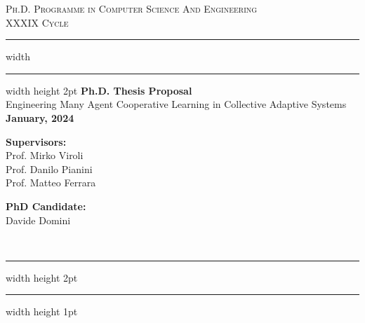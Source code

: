 \documentclass[12pt]{article}
\begin{document}
\begin{titlepage}

	\newcommand{\HRule}{\rule{\linewidth}{0.5mm}}
	\center
	
	\textsc{\Large Ph.D. Programme in Computer Science And Engineering}\\[0.5cm]
	
	\textsc{\Large XXXIX Cycle}\\[0.6cm]
	
	\hrule width \hsize \kern 1mm \hrule width \hsize height 2pt 
	\vspace{0.8cm}
	{ \large \bfseries Ph.D. Thesis Proposal}\\[0.6cm]
	{ \large Engineering Many Agent Cooperative Learning in Collective Adaptive Systems }\\[0.6cm]





	\bfseries{January, 2024}


    \vspace{1.5cm}
    
    \noindent
    \begin{minipage}[t]{0.45\textwidth}
        \raggedright
        \textbf{Supervisors:}\\[0.5cm]
        Prof. Mirko Viroli\\
        Prof. Danilo Pianini\\
        Prof. Matteo Ferrara
    \end{minipage}%
    \hfill
    \begin{minipage}[t]{0.45\textwidth}
        \raggedleft
        \textbf{PhD Candidate:}\\[0.5cm]
        Davide Domini
    \end{minipage} \\[0.6cm]
	

	\hrule width \hsize height 2pt \kern 1mm \hrule width \hsize height 1pt
	\vspace{0.4cm}
	
\end{titlepage}
\end{document}
